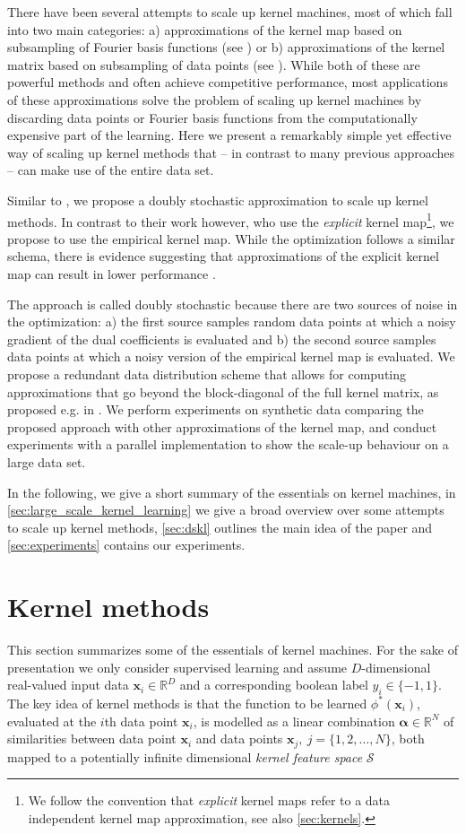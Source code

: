 \documentclass{article} %
\newcommand{\R}{\ensuremath{\mathds{R}}}
\newcommand{\va}{\boldsymbol{\alpha}}
\newcommand{\Bx}{\mathbf{x}}
\renewcommand{\vec}[1]{\mathbf{#1}}
\begin{document}
There have been several attempts to scale up kernel machines, most of which fall into two main categories: a) approximations of the kernel map based on subsampling of Fourier basis functions (see \cite{Rahimi2008}) or b) approximations of the kernel matrix based on subsampling of data points (see \cite{Williams2000}).
%
While both of these are powerful methods and often achieve competitive performance, most applications of these approximations solve the problem of scaling up kernel machines by discarding data points or Fourier basis functions from the computationally expensive part of the learning. 
Here we present a remarkably simple yet effective way of scaling up kernel methods that -- in contrast to many previous approaches -- can make use of the entire data set. 

Similar to \cite{Dai2014}, we propose a doubly stochastic approximation to scale up kernel methods. In contrast to their work however, who use the {\em explicit} kernel map\footnote{We follow the convention that {\em explicit} kernel maps refer to a data independent kernel map approximation, see also \autoref{sec:kernels}.}, we propose to use the empirical kernel map. While the optimization follows a similar schema, there is evidence suggesting that approximations of the explicit kernel map can result in lower performance \cite{Yang2012}.

The approach is called doubly stochastic because there are two sources of noise in the optimization: a) the first source samples random data points at which a noisy gradient of the dual coefficients is evaluated and b) the second source samples data points at which a noisy version of the empirical kernel map is evaluated. We propose a redundant data distribution scheme that allows for computing approximations that go beyond the block-diagonal of the full kernel matrix, as proposed e.g. in \cite{Deisenroth2015}. We perform experiments on synthetic data comparing the proposed approach with other approximations of the kernel map, and conduct experiments with a parallel implementation to show the scale-up behaviour on a large data set. 

In the following, we give a short summary of the essentials on kernel machines, in \autoref{sec:large_scale_kernel_learning} we give a broad overview over some attempts to scale up kernel methods, \autoref{sec:dskl} outlines the main idea of the paper and \autoref{sec:experiments} contains our experiments.

\section{Kernel methods}\label{sec:kernels}
This section summarizes some of the essentials of kernel machines. For the sake of presentation we only consider supervised learning and assume $D$-dimensional real-valued input data $\Bx_i\in\R^D$ and a corresponding boolean label $y_i\in\{-1,1\}$. The key idea of kernel methods is that the function to be learned $\phi^*(\Bx_i) $, evaluated at the $i$th data point $\Bx_i$, is modelled as a linear combination $\va\in\R^N$ of similarities between data point $\vec{x}_i$ and data points $\vec{x}_j,~j=\{1,2,\dots,N\}$, both mapped to a potentially infinite dimensional {\em kernel feature space} $\mathcal{S}$
\end{document}
